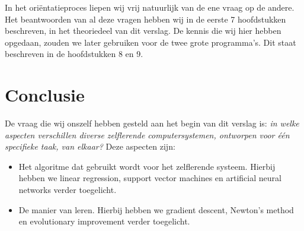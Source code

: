 \documentclass[a4paper,titlepage]{article}
\begin{document}
In het ori\"entatieproces liepen wij vrij natuurlijk van de ene vraag op de andere. Het beantwoorden van al deze vragen hebben wij in de eerste 7 hoofdstukken beschreven, in het theoriedeel van dit verslag. De kennis die wij hier hebben opgedaan, zouden we later gebruiken voor de twee grote programma's. Dit staat beschreven in de hoofdstukken 8 en 9.


\newpage


\newpage


\newpage


\newpage


\newpage


\newpage


\newpage


\newpage


\newpage
\section{Conclusie}
De vraag die wij onszelf hebben gesteld aan het begin van dit verslag is: \textit{in welke aspecten verschillen diverse zelflerende computersystemen, ontworpen voor \'e\'en specifieke taak, van elkaar?} Deze aspecten zijn:
\begin{itemize}  
\item Het algoritme dat gebruikt wordt voor het zelflerende systeem. Hierbij hebben we linear regression, support vector machines en artificial neural networks verder toegelicht.
\item De manier van leren. Hierbij hebben we gradient descent, Newton's method en evolutionary improvement verder toegelicht.
\end{itemize}


\newpage
\nocite{nonCitedSource1}
\nocite{nonCitedSource2}
\nocite{nonCitedSource3}
\nocite{nonCitedSource4}
\nocite{nonCitedSource5}
\nocite{nonCitedSource6}
\nocite{nonCitedSource7}
\nocite{nonCitedSource8}
\nocite{nonCitedSource9}
\nocite{nonCitedSource10}
\nocite{nonCitedSource11}
\nocite{nonCitedSource12}
\nocite{nonCitedSource13}
\printbibheading[title={Bronnen},heading=bibnumbered]
\printbibliography[keyword=Hoofdstuk2,heading=subbibnumbered,title={Hoofdstuk 2}]
\printbibliography[keyword=Hoofdstuk3,heading=subbibnumbered,title={Hoofdstuk 3}]
\printbibliography[keyword=Hoofdstuk4,heading=subbibnumbered,title={Hoofdstuk 4}]
\printbibliography[keyword=Hoofdstuk5,heading=subbibnumbered,title={Hoofdstuk 5}]
\printbibliography[keyword=Hoofdstuk6,heading=subbibnumbered,title={Hoofdstuk 6}]
\printbibliography[keyword=Hoofdstuk7,heading=subbibnumbered,title={Hoofdstuk 7}]
\printbibliography[keyword=Hoofdstuk8,heading=subbibnumbered,title={Hoofdstuk 8}]
\printbibliography[keyword=Hoofdstuk9,heading=subbibnumbered,title={Hoofdstuk 8}]
\end{document}
